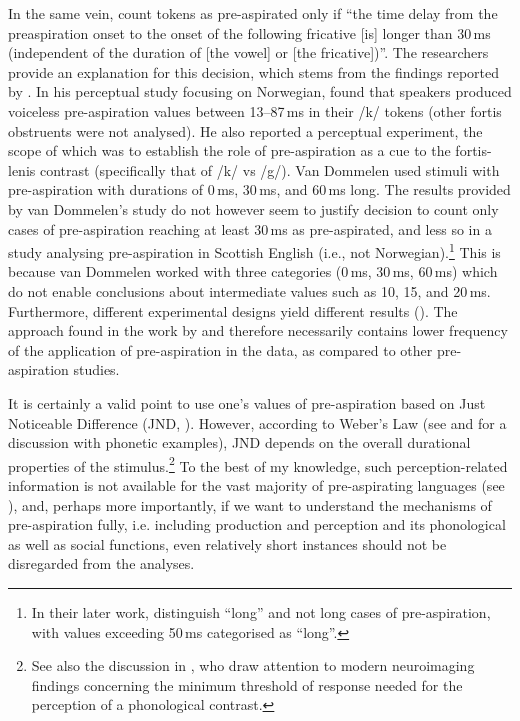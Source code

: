 \documentclass[output=paper]{langscibook}
\begin{document}
In the same vein, \citet[13]{GordeevaScobbie2010} count tokens as pre-aspirated only if “the time delay from the preaspiration onset to the onset of the following fricative [is] longer than 30\,ms (independent of the duration of [the vowel] or [the fricative])”. The researchers provide an explanation for this decision, which stems from the findings reported by \citet{Dommelen1998}. In his perceptual study focusing on Norwegian,  \citet{Dommelen1998} found that speakers produced voiceless pre\hyp aspiration values between 13--87\,ms in their /k/ tokens (other fortis obstruents were not analysed). He also reported a perceptual experiment, the scope of which was to establish the role of pre\hyp aspiration as a cue to the fortis-lenis contrast (specifically that of /k/ vs /g/). Van Dommelen used stimuli with pre\hyp aspiration with durations of 0\,ms, 30\,ms, and 60\,ms long. The results provided by van Dommelen’s study do not however seem to justify  decision to count only cases of pre\hyp aspiration reaching at least 30\,ms as pre-aspirated, and less so in a study analysing pre\hyp aspiration in Scottish English (i.e., not Norwegian).\footnote{In their later work, \citet{GordeevaScobbie2013} distinguish “long” and not long cases of pre-aspiration, with values exceeding 50\,ms categorised as “long”.} This is because van Dommelen worked with three categories (0\,ms, 30\,ms, 60\,ms) which do not enable conclusions about intermediate values such as 10, 15, and 20\,ms. Furthermore, different experimental designs yield different results (\citealt{HejnáKimper2019}). The approach found in the work by \citet{Helgason2002} and \citet{GordeevaScobbie2010} therefore necessarily contains lower frequency of the application of pre\hyp aspiration in the data, as compared to other pre\hyp aspiration studies. 

It is certainly a valid point to use one’s values of pre\hyp aspiration based on Just Noticeable Difference (JND, \citealt{SternJohnson2010}). However, according to Weber’s Law (see \citealt{Lehiste1977} and \citealt{Stifelman1994} for a discussion with phonetic examples), JND depends on the overall durational properties of the stimulus.\footnote{See also the discussion in \citet{Kuznetsovaetal2023}, who draw attention to modern neuroimaging findings concerning the minimum threshold of response needed for the perception of a phonological contrast.} To the best of my knowledge, such perception-related information is not available for the vast majority of pre-aspirating languages (see ), and, perhaps more importantly, if we want to understand the mechanisms of pre\hyp aspiration fully, i.e. including production and perception and its phonological as well as social functions, even relatively short instances should not be disregarded from the analyses.
\end{document}
